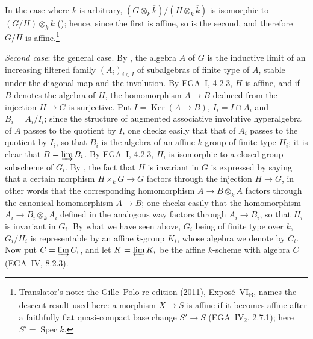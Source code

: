 In the case where \(k\) is arbitrary,
\((G\otimes_k\overline{k})/(H\otimes_k\overline{k})\) is isomorphic to
\((G/H)\otimes_k\overline{k}\)
\textup{()}; hence, since the first is
affine, so is the second, and therefore \(G/H\) is affine.\footnote{Translator's note: the
Gille--Polo re-edition (2011), Expos\'e~VI\textsubscript{B}, names the descent result used here: a morphism
\(X\to S\) is affine if it becomes affine after a faithfully flat quasi-compact base change \(S'\to S\)
(EGA~IV\(_2\), 2.7.1); here \(S'=\operatorname{Spec}\overline{k}\).}

\emph{Second case}: the general case. By , the
algebra \(A\) of \(G\) is the inductive limit of an increasing filtered family
\((A_i)_{i\in I}\) of subalgebras of finite type of \(A\), stable under the diagonal map
and the involution. By EGA~I, 4.2.3, \(H\) is affine, and if \(B\) denotes the algebra
of \(H\), the homomorphism \(A\to B\) deduced from the injection \(H\to G\) is
surjective. Put \(I=\operatorname{Ker}(A\to B)\), \(I_i=I\cap A_i\) and
\(B_i=A_i/I_i\); since the structure of augmented associative involutive hyperalgebra
of \(A\) passes to the quotient by \(I\), one checks easily that that of \(A_i\) passes
to the quotient by \(I_i\), so that \(B_i\) is the algebra of an affine \(k\)-group of
finite type \(H_i\); it is clear that \(B=\varinjlim B_i\). By EGA~I, 4.2.3, \(H_i\) is
isomorphic to a closed group subscheme of \(G_i\). By
, the fact that \(H\) is invariant in \(G\) is
expressed by saying that a certain morphism \(H\times_kG\to G\) factors through the
injection \(H\to G\), in other words that the corresponding homomorphism
\(A\to B\otimes_kA\) factors through the canonical homomorphism \(A\to B\); one checks
easily that the homomorphism \(A_i\to B_i\otimes_kA_i\) defined in the analogous way
factors through \(A_i\to B_i\), so that \(H_i\) is invariant in \(G_i\). By what we
have seen above, \(G_i\) being of finite type over \(k\), \(G_i/H_i\) is representable
by an affine \(k\)-group \(K_i\), whose algebra we denote by \(C_i\). Now put
\(C=\varinjlim C_i\), and let \(K=\varprojlim K_i\) be the affine \(k\)-scheme with
algebra \(C\) \textup{(EGA~IV, 8.2.3)}.

